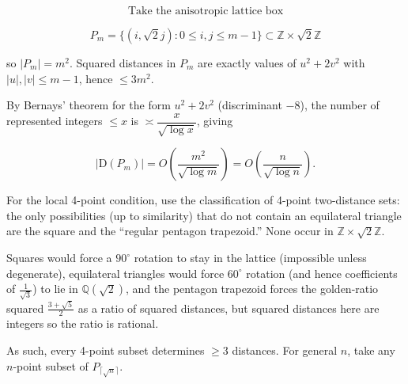 
\[
\text{Take the anisotropic lattice box}
\]

\[
P_m=\{(i,\sqrt{2}j):0\le i,j\le m-1\}\subset \mathbb{Z}\times \sqrt{2}\mathbb{Z}
\]

so \(|P_m|=m^2\). Squared distances in \(P_m\) are exactly values of \(u^2+2v^2\) with
\(|u|,|v|\le m-1\), hence \(\le 3m^2\).

By Bernays' theorem for the form \(u^2+2v^2\) (discriminant \(-8\)), the number of represented
integers \(\le x\) is \(\asymp \dfrac{x}{\sqrt{\log x}}\), giving

\[
|\mathrm{D}(P_m)|=O\!\left(\frac{m^2}{\sqrt{\log m}}\right)
=O\!\left(\frac{n}{\sqrt{\log n}}\right).
\]

For the local 4-point condition, use the classification of 4-point two-distance sets: the only possibilities (up to similarity) that do not
contain an equilateral triangle are the square and the ``regular pentagon trapezoid.''
None occur in \(\mathbb{Z}\times \sqrt{2}\mathbb{Z}\).

Squares would force a \(90^\circ\) rotation to stay in the lattice (impossible unless degenerate),
equilateral triangles would force \(60^\circ\) rotation (and hence coefficients of
\(\tfrac{1}{\sqrt{3}}\)) to lie in \(\mathbb{Q}(\sqrt{2})\), and the pentagon trapezoid forces
the golden-ratio squared \(\frac{3+\sqrt{5}}{2}\) as a ratio of squared distances, but squared
distances here are integers so the ratio is rational.

As such, every 4-point subset determines \(\ge 3\) distances. For general \(n\), take any
\(n\)-point subset of \(P_{\lceil \sqrt{n}\rceil}\).